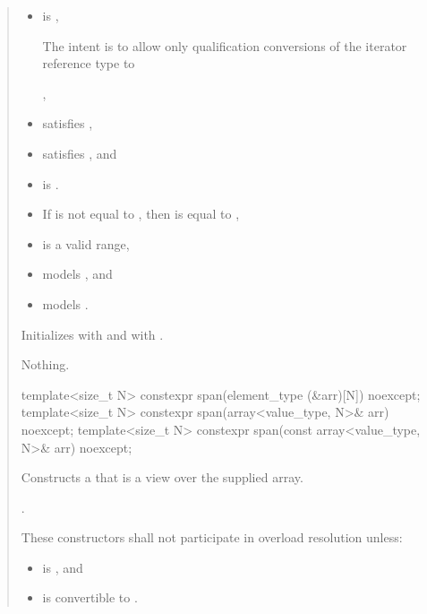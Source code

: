 \documentclass{wg21}
\begin{document}
\begin{quote}
\begin{addedblock}
\begin{itemdescr}
	 \pnum
	\constraints
	\begin{itemize}
		\item {} is ,
		\begin{note}The intent is to allow only qualification conversions of the iterator reference type to  \end{note},
		\item {} satisfies ,
		\item {} satisfies , and
		\item {} is .
	\end{itemize}

    \expects
    \begin{itemize}
    \item
    If  is not equal to ,
    then  is equal to ,
    \item {} is a valid range,
    \item {} models , and
    \item {} models .
    \end{itemize}

    \pnum
    \effects
    Initializes  with  and  with .

    \pnum
    \throws
    Nothing.


\end{itemdescr}
\end{addedblock}

\begin{itemdecl}
template<size_t N> constexpr span(element_type (&arr)[N]) noexcept;
template<size_t N> constexpr span(array<value_type, N>& arr) noexcept;
template<size_t N> constexpr span(const array<value_type, N>& arr) noexcept;
\end{itemdecl}
\begin{itemdescr}
    \pnum
    \effects
    Constructs a  that is a view over the supplied array.

    \pnum
    \ensures
    .

    \pnum
    \remarks
    These constructors shall not participate in overload resolution unless:
    \begin{itemize}
        \item {} is , and
        \item {} is convertible to .
    \end{itemize}
\end{itemdescr}


\end{quote}
\end{document}
